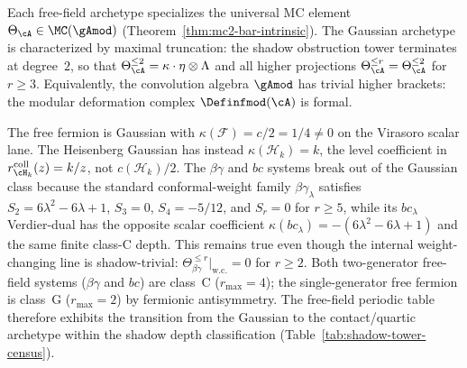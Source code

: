 \begin{remark}
\label{rem:free-fields-master-mc}
Each free-field archetype specializes the universal MC element $\Theta_\cA \in \MC(\gAmod)$
(Theorem~\ref{thm:mc2-bar-intrinsic}). The Gaussian archetype is
characterized by maximal truncation: the shadow
obstruction tower terminates at degree~$2$, so that
$\Theta_\cA^{\leq 2} = \kappa \cdot \eta \otimes \Lambda$ and all
higher projections $\Theta_\cA^{\leq r} = \Theta_\cA^{\leq 2}$ for
$r \geq 3$. Equivalently, the convolution algebra
$\gAmod$ has trivial higher brackets: the modular deformation complex
$\Definfmod(\cA)$ is formal.

The free fermion is Gaussian with
$\kappa(\mathcal F)=c/2=1/4\neq0$ on the Virasoro scalar lane. The
Heisenberg Gaussian has instead
$\kappa(\mathcal H_k)=k$, the level coefficient in
$r_{\cH_k}^{\mathrm{coll}}(z)=k/z$, not $c(\mathcal H_k)/2$.
The $\beta\gamma$ and $bc$ systems break out of the
Gaussian class because the standard conformal-weight family
$\beta\gamma_\lambda$ satisfies
$S_2 = 6\lambda^2 - 6\lambda + 1$, $S_3 = 0$, $S_4 = -5/12$,
and $S_r = 0$ for $r \ge 5$, while its $bc_\lambda$ Verdier-dual
has the opposite scalar coefficient
$\kappa(bc_\lambda)=-(6\lambda^2-6\lambda+1)$ and the same
finite class-C depth. This remains true even though the internal
weight-changing line is shadow-trivial:
$\Theta_{\beta\gamma}^{\le r}\big|_{\mathrm{w.c.}} = 0$ for
$r \ge 2$. Both two-generator free-field systems
($\beta\gamma$ and $bc$) are class~C ($r_{\max} = 4$); the
single-generator free fermion is class~G ($r_{\max} = 2$) by
fermionic antisymmetry. The free-field periodic table therefore
exhibits the transition from the Gaussian to the contact/quartic
archetype within the shadow depth classification
(Table~\ref{tab:shadow-tower-census}).
\end{remark}

